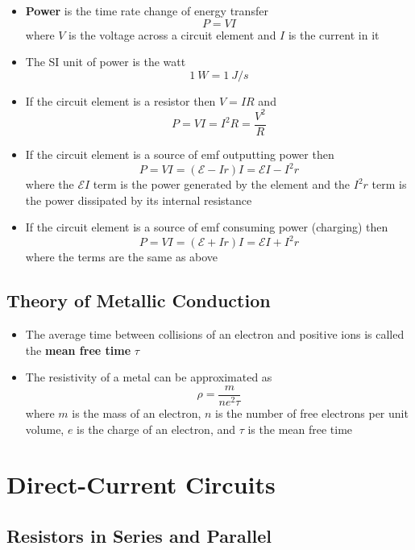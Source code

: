 \documentclass{article}
\begin{document}
\begin{itemize}
  \item \textbf{Power} is the time rate change of energy transfer \[P = V I\] where $V$ is the voltage across a circuit element and $I$ is the current in it

  \item The SI unit of power is the watt \[\qty{1}{W} = \qty{1}{J/s}\]

  \item If the circuit element is a resistor then $V = IR$ and \[P = V I = I^2 R = \frac{V^2}{R}\]

  \item If the circuit element is a source of emf outputting power then \[P = V I = (\mathcal{E} - I r) I = \mathcal{E} I - I^2 r\] where the $\mathcal{E} I$ term is the power generated by the element and the $I^2 r$ term is the power dissipated by its internal resistance

  \item If the circuit element is a source of emf consuming power (charging) then \[P = V I = (\mathcal{E} + I r) I = \mathcal{E} I + I^2 r\] where the terms are the same as above
\end{itemize}

\subsection{Theory of Metallic Conduction}

\begin{itemize}
  \item The average time between collisions of an electron and positive ions is called the \textbf{mean free time} $\tau$

  \item The resistivity of a metal can be approximated as \[\rho = \frac{m}{n e^2 \tau}\] where $m$ is the mass of an electron, $n$ is the number of free electrons per unit volume, $e$ is the charge of an electron, and $\tau$ is the mean free time
\end{itemize}

\section{Direct-Current Circuits}

\subsection{Resistors in Series and Parallel}
\end{document}

